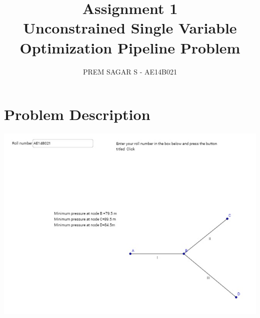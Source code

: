 \documentclass[10pt,a4paper]{article}
\author{PREM SAGAR S - AE14B021}
\title{Assignment 1 \\ Unconstrained Single Variable Optimization   Pipeline Problem}
\begin{document}
\maketitle
\justify

\section{Problem Description}
\begin{center}
 \includegraphics[scale=0.8]{p1}
\end{center}
 
\end{document}
